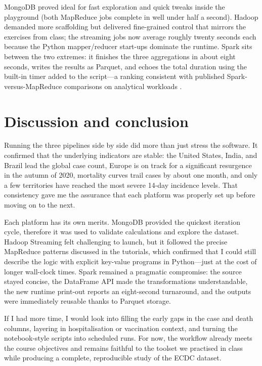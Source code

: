 \documentclass[12pt,a4paper]{article}
\begin{document}
MongoDB proved ideal for fast exploration and quick tweaks inside the playground (both MapReduce jobs complete in well under half a second). Hadoop demanded more scaffolding but delivered fine-grained control that mirrors the exercises from class; the streaming jobs now average roughly twenty seconds each because the Python mapper/reducer start-ups dominate the runtime. Spark sits between the two extremes: it finishes the three aggregations in about eight seconds, writes the results as Parquet, and echoes the total duration using the built-in timer added to the script—a ranking consistent with published Spark-versus-MapReduce comparisons on analytical workloads \cite{tekdoganBenchmarkingApacheSpark2021,vermaBigDataManagement2016}.

\newpage
\section{Discussion and conclusion}
Running the three pipelines side by side did more than just stress the software.    It confirmed that the underlying indicators are stable: the United States, India, and Brazil lead the global case count, Europe is on track for a significant resurgence in the autumn of 2020, mortality curves trail cases by about one month, and only a few territories have reached the most severe 14-day incidence levels.  That consistency gave me the assurance that each platform was properly set up before moving on to the next.

Each platform has its own merits. MongoDB provided the quickest iteration cycle, therefore it was used to validate calculations and explore the dataset. Hadoop Streaming felt challenging to launch, but it followed the precise MapReduce patterns discussed in the tutorials, which confirmed that I could still describe the logic with explicit key-value programs in Python—just at the cost of longer wall-clock times. Spark remained a pragmatic compromise: the source stayed concise, the DataFrame API made the transformations understandable, the new runtime print-out reports an eight-second turnaround, and the outputs were immediately reusable thanks to Parquet storage.

If I had more time, I would look into filling the early gaps in the case and death columns, layering in hospitalisation or vaccination context, and turning the notebook-style scripts into scheduled runs. For now, the workflow already meets the course objectives and remains faithful to the toolset we practised in class while producing a complete, reproducible study of the ECDC dataset.
\end{document}
